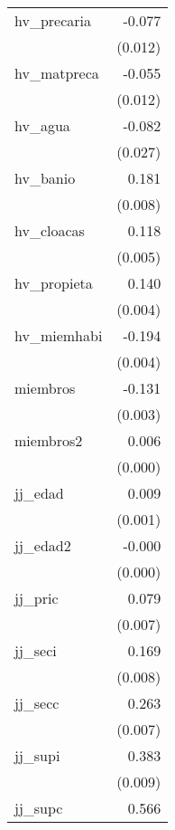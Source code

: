 {\begin{longtable}{l*{1}{D{.}{.}{-1}}}
\addlinespace
hv\_precaria &      -0.077\sym{***}\\
            &     (0.012)         \\
\addlinespace
hv\_matpreca &      -0.055\sym{***}\\
            &     (0.012)         \\
\addlinespace
hv\_agua     &      -0.082\sym{**} \\
            &     (0.027)         \\
\addlinespace
hv\_banio    &       0.181\sym{***}\\
            &     (0.008)         \\
\addlinespace
hv\_cloacas  &       0.118\sym{***}\\
            &     (0.005)         \\
\addlinespace
hv\_propieta &       0.140\sym{***}\\
            &     (0.004)         \\
\addlinespace
hv\_miemhabi &      -0.194\sym{***}\\
            &     (0.004)         \\
\addlinespace
miembros    &      -0.131\sym{***}\\
            &     (0.003)         \\
\addlinespace
miembros2   &       0.006\sym{***}\\
            &     (0.000)         \\
\addlinespace
jj\_edad     &       0.009\sym{***}\\
            &     (0.001)         \\
\addlinespace
jj\_edad2    &      -0.000\sym{***}\\
            &     (0.000)         \\
\addlinespace
jj\_pric     &       0.079\sym{***}\\
            &     (0.007)         \\
\addlinespace
jj\_seci     &       0.169\sym{***}\\
            &     (0.008)         \\
\addlinespace
jj\_secc     &       0.263\sym{***}\\
            &     (0.007)         \\
\addlinespace
jj\_supi     &       0.383\sym{***}\\
            &     (0.009)         \\
\addlinespace
jj\_supc     &       0.566\sym{***}\\

\end{longtable}}
